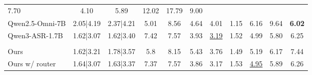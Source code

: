 \documentclass{llmxive}
\begin{document}
\begin{table}[t]
\begin{tabular}{lcccccccccc}
7.70 &
4.10 &
5.89 &
12.02 &
17.79 &
9.00 \\
Qwen2.5-Omni-7B &
2.05|4.19 &
2.37|4.21 &
5.01 &
8.56 &
4.64 &
4.01 &
1.15 &
6.16 &
9.64 &
\textbf{6.02} \\
Qwen3-ASR-1.7B &
1.62|3.07 &
1.62|3.40 &
7.42 &
7.57 &
3.93 &
\underline{3.19} &
1.52 &
4.99 &
5.80 &
6.25 \\
\rowcolor{headerblue}
\multicolumn{11}{l}{\textit{Our model}} \\
Ours &
1.62|3.21 &
1.78|3.57 &
5.8 &
8.15 &
5.43 &
3.76 &
1.49 &
5.19 &
6.17 &
7.44 \\
Ours w/ router &
1.64|3.07 &
1.63|3.37 &
7.37 &
7.57 &
3.86 &
3.17 &
1.53 &
\underline{4.95} &
5.89 &
6.26 \\
\bottomrule
\end{tabular}











\end{table}
\end{document}

